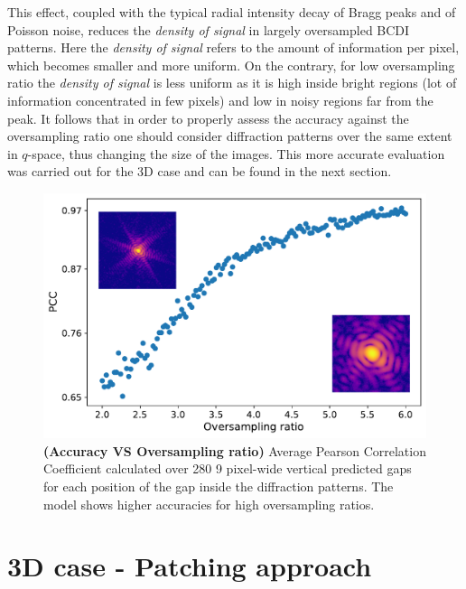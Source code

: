 This effect, coupled with the typical radial
intensity decay of Bragg peaks and of Poisson noise, reduces the \textit{density of signal} in largely oversampled BCDI 
patterns. Here the \textit{density of signal} refers to the amount of information per pixel, which becomes smaller and more uniform. 
On the contrary, for low oversampling ratio the \textit{density of signal} is less uniform as it is high inside bright 
regions (lot of information concentrated in few pixels) and low in noisy regions far from the peak. It follows that 
in order to properly assess the accuracy against the oversampling ratio one should consider diffraction patterns over 
the same extent in $q$-space, thus changing the size of the images. This more accurate evaluation was carried out for 
the 3D case and can be found in the next section.

\begin{figure}[h]
    \centering
    \includegraphics[width=.7\textwidth]{figures/Inpainting/2D_acc_ovs.pdf}
    \caption{\textbf{(Accuracy VS Oversampling ratio)} Average Pearson Correlation Coefficient calculated over 280
    9 pixel-wide vertical predicted gaps for each position of the gap inside the diffraction patterns. The model 
    shows higher accuracies for high oversampling ratios.}
    \label{fig:accVSovs}
\end{figure}

\section{3D case - Patching approach}\label{sec:patching}


